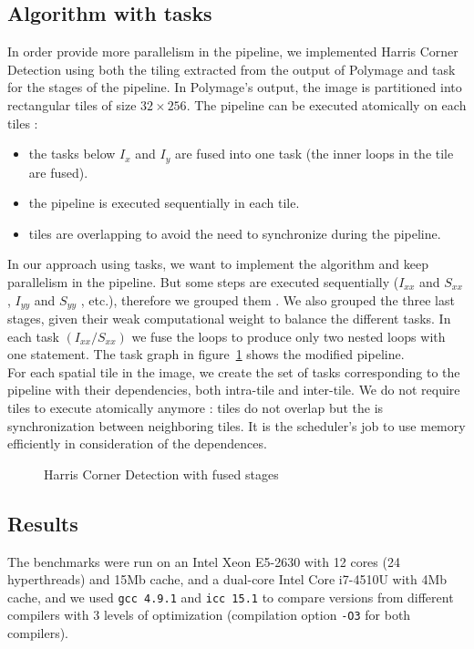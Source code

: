 \documentclass[a4paper,11pt]{article}
\begin{document}
\subsection{Algorithm with tasks}
In order provide more parallelism in the pipeline, we implemented Harris Corner Detection using 
both the tiling extracted from the output of Polymage and task for the stages
of the pipeline.
In Polymage's output, the image is partitioned into rectangular tiles of size $32 \times 256$.
The pipeline can be executed atomically on each tiles : 
\begin{itemize}
 \item the tasks below $I_x$ and $I_y$ are fused into one task (the inner loops in the tile
 are fused).
 \item the pipeline is executed sequentially in each tile.
 \item tiles are overlapping to avoid the need to synchronize during the pipeline.
\end{itemize}
In our approach using tasks, we want to implement the algorithm and keep 
parallelism in the pipeline. But some steps 
are executed sequentially ($I_{xx}$ and $S_{xx}$ , $I_{yy}$
and $S_{yy}$ , etc.), therefore we grouped them . We also grouped the three last
stages, given their weak computational weight to balance the different tasks. In each task
$(I_{xx} / S_{xx})$ we fuse the loops to produce only two nested loops with one statement. The
task graph in figure~\ref{fused_pipeline} shows the modified pipeline. \\
For each spatial tile in the image, we create the set of tasks corresponding to the pipeline
with their dependencies, both intra-tile and inter-tile. We do not require tiles to execute 
atomically anymore : tiles do not overlap but the is synchronization between neighboring tiles.
It is the scheduler’s job to use memory efficiently in consideration of the dependences.

\begin{figure}
\begin{center}
 
\end{center}
 \caption{Harris Corner Detection with fused stages}
 \label{fused_pipeline}
\end{figure}


\subsection{Results}
The benchmarks were run on an Intel Xeon E5-2630 with 12 cores (24 hyperthreads) and
15Mb cache, and a dual-core Intel Core i7-4510U with 4Mb cache, and we used \texttt{gcc 4.9.1}
and \texttt{icc 15.1} to compare versions from different compilers with 3 levels of optimization
(compilation option \texttt{-O3} for both compilers).
\end{document}
